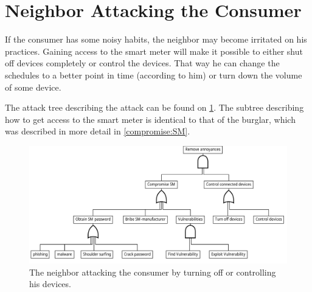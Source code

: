 \section{Neighbor Attacking the Consumer}

If the consumer has some noisy habits, the neighbor may become irritated on his practices.
Gaining access to the smart meter will make it possible to either shut off devices completely or control the devices.
That way he can change the schedules to a better point in time (according to him) or turn down the volume of some device.

The attack tree describing the attack can be found on \cref{fig:attack_trees:neighbor}.
The subtree describing how to get access to the smart meter is identical to that of the burglar, which was described in more detail in \cref{compromise:SM}.

\begin{figure}[h]
  \centering
	\includegraphics[width=\textwidth]{figures/graphviz/neighbor_vs_consumer.pdf}
	\caption{The neighbor attacking the consumer by turning off or controlling his devices.}
	\label{fig:attack_trees:neighbor}
\end{figure}